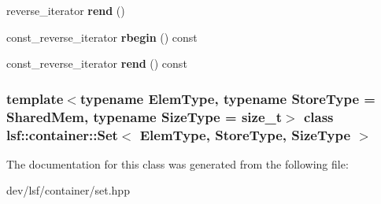 \begin{DoxyCompactItemize}
\item 
\hypertarget{classlsf_1_1container_1_1Set_a3f18b8772ebb6acb5b210993175b54da}{
reverse\_\-iterator {\bfseries rend} ()}
\label{classlsf_1_1container_1_1Set_a3f18b8772ebb6acb5b210993175b54da}

\item 
\hypertarget{classlsf_1_1container_1_1Set_ae1af2f2f131fb4ed151e35844192fe07}{
const\_\-reverse\_\-iterator {\bfseries rbegin} () const }
\label{classlsf_1_1container_1_1Set_ae1af2f2f131fb4ed151e35844192fe07}

\item 
\hypertarget{classlsf_1_1container_1_1Set_ac6336e0211e8e0e7bed27a0bde875a5d}{
const\_\-reverse\_\-iterator {\bfseries rend} () const }
\label{classlsf_1_1container_1_1Set_ac6336e0211e8e0e7bed27a0bde875a5d}

\end{DoxyCompactItemize}
\subsubsection*{template$<$typename ElemType, typename StoreType = SharedMem, typename SizeType = size\_\-t$>$ class lsf::container::Set$<$ ElemType, StoreType, SizeType $>$}



The documentation for this class was generated from the following file:\begin{DoxyCompactItemize}
\item 
dev/lsf/container/set.hpp\end{DoxyCompactItemize}

